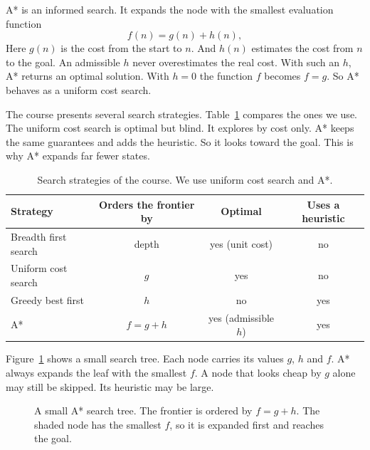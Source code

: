 \documentclass[11pt,a4paper]{article}
\begin{document}
A* is an informed search. It expands the node with the smallest evaluation
function
\[
f(n) = g(n) + h(n),
\]
Here $g(n)$ is the cost from the start to $n$. And $h(n)$ estimates the cost from
$n$ to the goal. An admissible $h$ never overestimates the real cost. With such an
$h$, A* returns an optimal solution. With $h = 0$ the function $f$ becomes
$f = g$. So A* behaves as a uniform cost search.

The course presents several search strategies. Table~\ref{tab:strategies} compares
the ones we use. The uniform cost search is optimal but blind. It explores by cost
only. A* keeps the same guarantees and adds the heuristic. So it looks toward the
goal. This is why A* expands far fewer states.

\begin{table}[H]
\centering
\small
\begin{tabular}{lccc}
\toprule
Strategy & Orders the frontier by & Optimal & Uses a heuristic \\
\midrule
Breadth first search & depth & yes (unit cost) & no \\
Uniform cost search  & $g$ & yes & no \\
Greedy best first    & $h$ & no & yes \\
A*                   & $f = g + h$ & yes (admissible $h$) & yes \\
\bottomrule
\end{tabular}
\caption{Search strategies of the course. We use uniform cost search and A*.}
\label{tab:strategies}
\end{table}

Figure~\ref{fig:tree} shows a small search tree. Each node carries its values
$g$, $h$ and $f$. A* always expands the leaf with the smallest $f$. A node that
looks cheap by $g$ alone may still be skipped. Its heuristic may be large.

\begin{figure}[H]
\centering
{}
\caption{A small A* search tree. The frontier is ordered by $f = g + h$. The
shaded node has the smallest $f$, so it is expanded first and reaches the goal.}
\label{fig:tree}
\end{figure}
\end{document}
